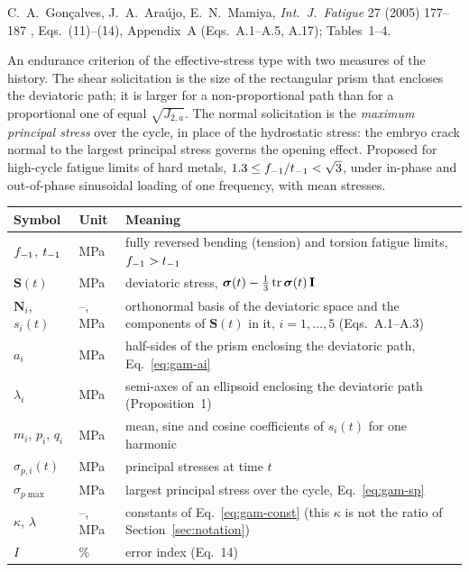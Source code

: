 \label{sheet:GAM}

 C.~A.~Gon\c{c}alves, J.~A.~Ara\'ujo, E.~N.~Mamiya, \emph{Int.\ J.\ Fatigue} 27 (2005)
177--187 \cite{goncalves2005}, Eqs.~(11)--(14), Appendix~A (Eqs.~A.1--A.5, A.17); Tables~1--4.

 An endurance criterion of the effective-stress type with two measures of the
history. The shear solicitation is the size of the rectangular prism that encloses the deviatoric
path; it is larger for a non-proportional path than for a proportional one of equal
$\sqrt{J_{2,a}}$. The normal solicitation is the \emph{maximum principal stress} over the cycle, in
place of the hydrostatic stress: the embryo crack normal to the largest principal stress governs the
opening effect. Proposed for high-cycle fatigue limits of hard metals,
$1.3\le f_{-1}/t_{-1}<\sqrt3$, under in-phase and out-of-phase sinusoidal loading of one frequency, with
mean stresses.

\begin{center}\small
\begin{tabular}{@{}llp{100mm}@{}}
\toprule
Symbol & Unit & Meaning\\\midrule
$f_{-1}$, $t_{-1}$ & MPa & fully reversed bending (tension) and torsion fatigue limits, $f_{-1}>t_{-1}$\\
$\mathbf S(t)$ & MPa & deviatoric stress, $\boldsymbol\sigma(t)-\tfrac13\operatorname{tr}\boldsymbol\sigma(t)\,\mathbf I$\\
$\mathbf N_i$, $s_i(t)$ & --, MPa & orthonormal basis of the deviatoric space and the components of $\mathbf S(t)$ in it, $i=1,\dots,5$ (Eqs.~A.1--A.3)\\
$a_i$ & MPa & half-sides of the prism enclosing the deviatoric path, Eq.~\eqref{eq:gam-ai}\\
$\lambda_i$ & MPa & semi-axes of an ellipsoid enclosing the deviatoric path (Proposition~1)\\
$m_i$, $p_i$, $q_i$ & MPa & mean, sine and cosine coefficients of $s_i(t)$ for one harmonic\\
$\sigma_{p,i}(t)$ & MPa & principal stresses at time $t$\\
$\sigma_{p\max}$ & MPa & largest principal stress over the cycle, Eq.~\eqref{eq:gam-sp}\\
$\kappa$, $\lambda$ & --, MPa & constants of Eq.~\eqref{eq:gam-const} (this $\kappa$ is not the ratio of Section~\ref{sec:notation})\\
$I$ & \% & error index (Eq.~14)\\
\bottomrule
\end{tabular}
\end{center}

